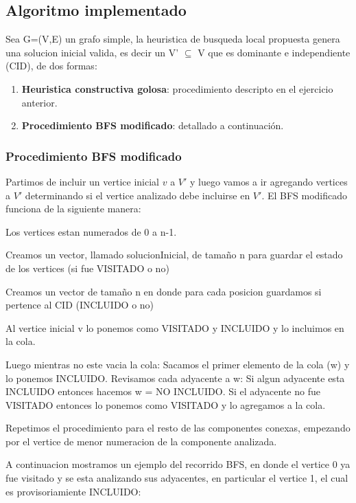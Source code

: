 \subsection{Algoritmo implementado}

Sea G=(V,E) un grafo simple, la heuristica de busqueda local propuesta genera una solucion inicial valida, es decir un V' $\subseteq$ V que es dominante e independiente (CID), de dos formas:
\begin{enumerate}
	\item \textbf{Heuristica constructiva golosa}: procedimiento descripto en el ejercicio anterior.
    \item \textbf{Procedimiento BFS modificado}: detallado a continuación.

\end{enumerate}

\subsubsection{Procedimiento BFS modificado}
Partimos de incluir un vertice inicial $v$ a $V'$ y luego vamos a ir agregando vertices a $V'$ determinando si el vertice analizado debe incluirse en $V'$.
El BFS modificado funciona de la siguiente manera:

\begin{codesnippet}
Los vertices estan numerados de 0 a n-1.

Creamos un vector, llamado solucionInicial, de tamaño n para guardar el estado de los 
vertices (si fue VISITADO o no)

Creamos un vector de tamaño n en donde para cada posicion guardamos si 
pertence al CID (INCLUIDO o no)

Al vertice inicial v lo ponemos como VISITADO y INCLUIDO y lo incluimos en la cola.

Luego mientras no este vacia la cola:
    Sacamos el primer elemento de la cola (w) y lo ponemos INCLUIDO.
    Revisamos cada adyacente a w:
        Si algun adyacente esta INCLUIDO entonces hacemos w = NO INCLUIDO.
        Si el adyacente no fue VISITADO entonces lo ponemos como VISITADO y 
        lo agregamos a la cola.

Repetimos el procedimiento para el resto de las componentes conexas, empezando por 
el vertice de menor numeracion de la componente analizada.


\end{codesnippet}

A continuacion mostramos un ejemplo del recorrido BFS, en donde el vertice 0 ya fue visitado y se esta analizando sus adyacentes, en particular el vertice 1, el cual es provisoriamiente INCLUIDO:


